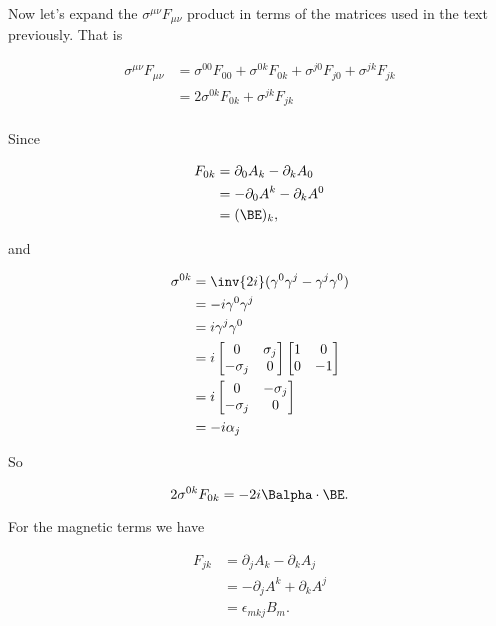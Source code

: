 Now let's expand the $\sigma^{\mu \nu} F_{\mu \nu}$ product in terms of the matrices used in the text previously.  That is

\begin{align*}
\sigma^{\mu \nu} F_{\mu \nu}
&=
\sigma^{0 0} F_{0 0}
+\sigma^{0 k} F_{0 k}
+\sigma^{j 0} F_{j 0}
+\sigma^{j k} F_{j k} \\
&=
2 \sigma^{0 k} F_{0 k}
+\sigma^{j k} F_{j k} \\
\end{align*}

Since 

\begin{align*}
F_{0 k}
&=
\partial_0 A_k -\partial_k A_0 \\
&=
-\partial_0 A^k -\partial_k A^0 \\
&= (\BE)_k,
\end{align*}

and

\begin{align*}
\sigma^{0 k}
&=
\inv{2 i} (\gamma^0 \gamma^j - \gamma^j \gamma^0) \\
&=
-i \gamma^0 \gamma^j  \\
&=
i \gamma^j \gamma^0  \\
&=
i
\begin{bmatrix}
0 & \sigma_j \\
-\sigma_j & 0
\end{bmatrix}
\begin{bmatrix}
1 & 0 \\
0 & -1
\end{bmatrix} \\
&= 
i
\begin{bmatrix}
0 & -\sigma_j \\
-\sigma_j & 0
\end{bmatrix} \\
&=
-i \alpha_j
\end{align*}

So

\begin{equation}\label{eqn:diracCovariant:400}
2 \sigma^{0 k} F_{0 k} = -2 i \Balpha \cdot \BE.
\end{equation}

For the magnetic terms we have

\begin{align*}
F_{j k} 
&= \partial_j A_k - \partial_k A_j \\
&= -\partial_j A^k + \partial_k A^j \\
&= \epsilon_{m k j} B_m.
\end{align*}

